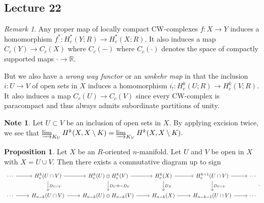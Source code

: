 \documentclass[10pt,letterpaper,cm]{nupset}
\theoremstyle{definition}
\newtheorem{note}[definition]{Note}
\theoremstyle{theorem}
\newtheorem{prop}[definition]{Proposition}
\theoremstyle{remark}
\newtheorem{remark}[definition]{Remark}
\newcommand{\R}{\mathbb{R}}
\newcommand{\1}{\mathbb{1}}
\newcommand{\0}{\vec 0}
\begin{document}
\subsection{Lecture 22}

\begin{remark}
Any  proper map of locally compact CW-complexes $f: X \to Y$ induces  a homomorphism $f^{\ast}: H_c^{\ast}(Y; R) \to H_c^{\ast}(X; R)$. It also induces a map $C_c(Y) \to C_c(X)$ where $C_c({-})$ where $C_c({\cdot})$ denotes the space of compactly supported  maps ${\cdot} \to \R$.

But we also have a \textit{wrong way functor} or an \textit{umkehr map} in that the inclusion $i: U \to V$ of open sets in $X$ induces a homomorphism $i_{!} : H_c^k(U; R) \to H_c^k(V; R)$. It also induces a map $C_c(U) \to C_c(V)$ since every CW-complex is paracompact and thus always admits subordinate partitions of unity.
\end{remark}

\begin{note}
Let $U \subset V$ be an inclusion of open sets in $X$. By applying excision twice, we see that $\varinjlim_{K_U} H^k(X, X \setminus K) = \varinjlim_{K_V} H^k(X, X \setminus K).$
\end{note}

\begin{prop}
Let $X$ be an $R$-oriented $n$-manifold.  Let $U$ and $V$ be open in $X$ with $X = U \cup V$. Then there exists a commutative diagram up to sign
\[
\begin{tikzcd}
\cdots \arrow[r] & H^k_c(U \cap V) \arrow[r] \arrow[d, "D_{U \cap V}"] & H_c^k(U)\oplus H_c^k(V) \arrow[r] \arrow[d, "D_U \oplus {-}D_V"] & H_c^k(X) \arrow[r] \arrow[d, "D_X"] & H^{k+1}_c(U \cap V) \arrow[d, "D_{U \cap V}"] \arrow[r] & \cdots \\
\cdots \arrow[r] & H_{n-k}(U \cap V) \arrow[r]                         & H_{n-k}(U) \oplus H_{n-k}(V) \arrow[r]                           & H_{n-k}(X) \arrow[r]                & H_{n-k-1}(U \cap V) \arrow[r]                         & \cdots
\end{tikzcd}
.\]
\end{prop}
\end{document}
